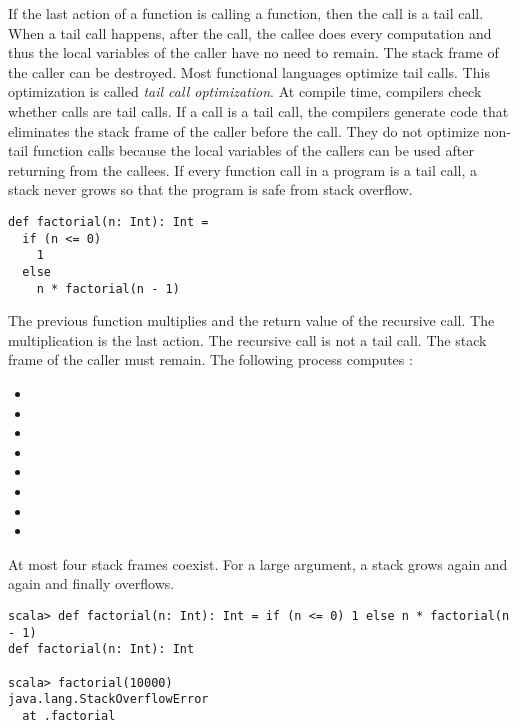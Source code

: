 If the last action of a function is calling a function, then the call is a tail
call. When a tail call happens, after the call, the callee does every
computation and thus the local variables of the caller have no need to
remain. The stack frame of the caller can be destroyed. Most functional languages
optimize tail calls. This optimization is called \textit{tail call optimization}.
At compile time, compilers check whether calls are tail
calls. If a call is a tail call, the compilers generate code that eliminates the
stack frame of the caller before the call. They do not optimize non-tail function
calls because the local variables of the callers can be used after returning from
the callees. If every function call in a program is a tail call, a stack never
grows so that the program is safe from stack overflow.

\begin{verbatim}
def factorial(n: Int): Int =
  if (n <= 0)
    1
  else
    n * factorial(n - 1)
\end{verbatim}

The previous  function multiplies  and the return value
of the recursive  call. The multiplication is the last
action. The recursive call is not a tail call. The stack frame of the caller must
remain. The following process computes :

\begin{itemize}
\item {}
\item {}
\item {}
\item {}
\item {}
\item {}
\item {}
\item {}
\end{itemize}

At most four stack frames coexist. For a large argument, a stack grows
again and again and finally overflows.

\begin{verbatim}
scala> def factorial(n: Int): Int = if (n <= 0) 1 else n * factorial(n - 1)
def factorial(n: Int): Int

scala> factorial(10000)
java.lang.StackOverflowError
  at .factorial
\end{verbatim}

